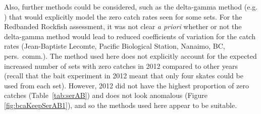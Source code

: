 Also, further methods could be considered, such as the delta-gamma method
(e.g. \citealt{lbaebp13}) that would explicitly model the zero catch rates seen
for some sets. For the Redbanded Rockfish assessment, it was not clear \emph{a
  priori} whether or not the delta-gamma method would lead to reduced
coefficients of variation for the catch rates (Jean-Baptiste Lecomte, Pacific
Biological Station, Nanaimo, BC, pers.~comm.). The method used here does not
explicitly account for the expected increased number of sets with zero catches
in 2012 compared to other years (recall that the bait experiment in 2012 meant
that only four skates could be used from each set). However, 2012 did not have
the highest proportion of zero catches (Table~\ref{tab:serAB}) and does not look
anomalous (Figure \ref{fig:bcaKeepSerAB1}), and so the methods used here appear
to be suitable.


\clearpage
